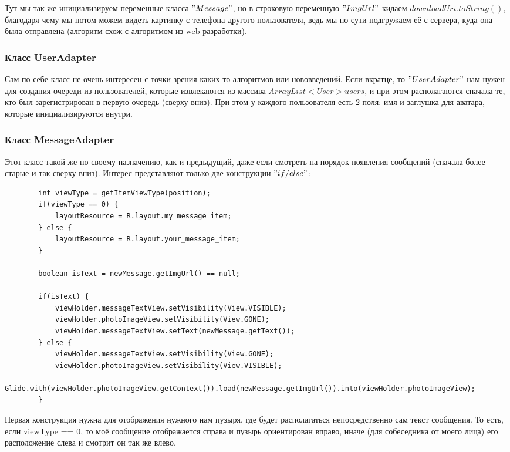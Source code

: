 \documentclass[utf8,14pt,a4paper,oneside,russian]{book}
\begin{document}
	Тут мы так же инициализируем переменные класса $"Message"$, но в строковую переменную $"ImgUrl"$ кидаем $downloadUri.toString()$, благодаря чему мы потом можем видеть картинку с телефона другого пользователя, ведь мы по сути подгружаем её с сервера, куда она была отправлена (алгоритм схож с алгоритмом из web-разработки).
	
	\subsubsection{Класс UserAdapter}
	
	Сам по себе класс не очень интересен с точки зрения каких-то алгоритмов или нововведений. Если вкратце, то $"UserAdapter"$ нам нужен для создания очереди из пользователей, которые извлекаются из массива $ArrayList<User> users$, и при этом располагаются сначала те, кто был зарегистрирован в первую очередь (сверху вниз). При этом у каждого пользователя есть 2 поля: имя и заглушка для аватара, которые инициализируются внутри.
	
	\subsubsection{Класс MessageAdapter}
	
	Этот класс такой же по своему назначению, как и предыдущий, даже если смотреть на порядок появления сообщений (сначала более старые и так сверху вниз). Интерес представляют только две конструкции $"if/else"$:
	
	\begin{lstlisting}
		int viewType = getItemViewType(position);
		if(viewType == 0) {
			layoutResource = R.layout.my_message_item;
		} else {
			layoutResource = R.layout.your_message_item;
		}
		
		boolean isText = newMessage.getImgUrl() == null;
		
		if(isText) {
			viewHolder.messageTextView.setVisibility(View.VISIBLE);
			viewHolder.photoImageView.setVisibility(View.GONE);
			viewHolder.messageTextView.setText(newMessage.getText());
		} else {
			viewHolder.messageTextView.setVisibility(View.GONE);
			viewHolder.photoImageView.setVisibility(View.VISIBLE);
			Glide.with(viewHolder.photoImageView.getContext()).load(newMessage.getImgUrl()).into(viewHolder.photoImageView);
		}
	\end{lstlisting}

	Первая конструкция нужна для отображения нужного нам пузыря, где будет располагаться непосредственно сам текст сообщения. То есть, если viewType == 0, то моё сообщение отображается справа и пузырь ориентирован вправо, иначе (для собеседника от моего лица) его расположение слева и смотрит он так же влево.
	
\end{document}
